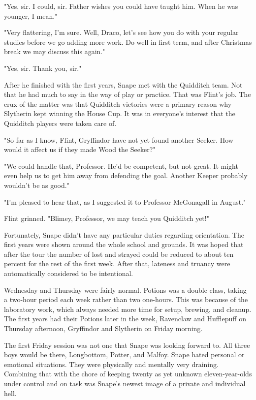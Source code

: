 "Yes, sir. I could, sir. Father wishes you could have taught him. When he was younger, I mean."

"Very flattering, I'm sure. Well, Draco, let's see how you do with your regular studies before we go adding more work. Do well in first term, and after Christmas break we may discuss this again."

"Yes, sir. Thank you, sir."

After he finished with the first years, Snape met with the Quidditch team. Not that he had much to say in the way of play or practice. That was Flint's job. The crux of the matter was that Quidditch victories were a primary reason why Slytherin kept winning the House Cup. It was in everyone's interest that the Quidditch players were taken care of.

"So far as I know, Flint, Gryffindor have not yet found another Seeker. How would it affect us if they made Wood the Seeker?"

"We could handle that, Professor. He'd be competent, but not great. It might even help us to get him away from defending the goal. Another Keeper probably wouldn't be as good."

"I'm pleased to hear that, as I suggested it to Professor McGonagall in August."

Flint grinned. "Blimey, Professor, we may teach you Quidditch yet!"

Fortunately, Snape didn't have any particular duties regarding orientation. The first years were shown around the whole school and grounds. It was hoped that after the tour the number of lost and strayed could be reduced to about ten percent for the rest of the first week. After that, lateness and truancy were automatically considered to be intentional.

Wednesday and Thursday were fairly normal. Potions was a double class, taking a two-hour period each week rather than two one-hours. This was because of the laboratory work, which always needed more time for setup, brewing, and cleanup. The first years had their Potions later in the week, Ravenclaw and Hufflepuff on Thursday afternoon, Gryffindor and Slytherin on Friday morning.

The first Friday session was not one that Snape was looking forward to. All three boys would be there, Longbottom, Potter, and Malfoy. Snape hated personal or emotional situations. They were physically and mentally very draining. Combining that with the chore of keeping twenty as yet unknown eleven-year-olds under control and on task was Snape's newest image of a private and individual hell.

